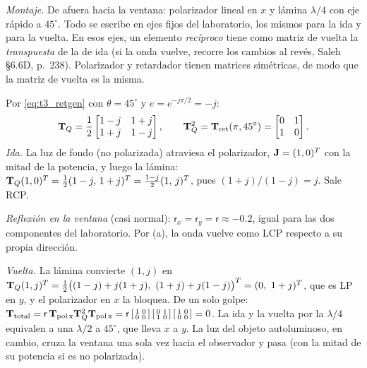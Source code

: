  \emph{Montaje.} De afuera hacia la ventana: polarizador lineal en $x$ y lámina $\lambda/4$
con eje rápido a $45^\circ$. Todo se escribe en ejes fijos del laboratorio, los mismos para la ida y
para la vuelta. En esos ejes, un elemento \emph{recíproco} tiene como matriz de vuelta la
\emph{transpuesta} de la de ida (si la onda vuelve, recorre los cambios al revés, Saleh §6.6D,
p.~238). Polarizador y retardador tienen matrices simétricas, de modo que la matriz de vuelta es la misma.

Por \eqref{eq:t3_retgen} con $\theta=45^\circ$ y $e=e^{-j\pi/2}=-j$:
\[
\mathbf T_Q=\frac12\begin{bmatrix}1-j&1+j\\1+j&1-j\end{bmatrix},\qquad
\mathbf T_Q^2=\mathbf T_{\rm ret}(\pi,45^\circ)=\begin{bmatrix}0&1\\1&0\end{bmatrix}.
\]
\emph{Ida.} La luz de fondo (no polarizada) atraviesa el polarizador, $\mathbf J=(1,0)^T$ con la mitad de la
potencia, y luego la lámina:
$\mathbf T_Q(1,0)^T=\frac12(1-j,\,1+j)^T=\frac{1-j}{2}(1,\,j)^T$, pues $(1+j)/(1-j)=j$. Sale RCP.

\emph{Reflexión en la ventana} (casi normal): $\mathsf r_x=\mathsf r_y=\mathsf r\approx-0.2$, igual para las dos
componentes del laboratorio. Por (a), la onda vuelve como LCP respecto a su propia dirección.

\emph{Vuelta.} La lámina convierte $(1,j)$ en
$\T_Q(1,j)^T=\frac12\big((1-j)+j(1+j),\ (1+j)+j(1-j)\big)^T=(0,\ 1+j)^T$, que es LP en $y$, y el polarizador en $x$ la bloquea.
De un solo golpe: $\mathbf T_{\rm total}=\mathsf r\,\mathbf T_{\rm pol\,x}\mathbf T_Q^2\mathbf T_{\rm pol\,x}
=\mathsf r\left[\begin{smallmatrix}1&0\\0&0\end{smallmatrix}\right]\left[\begin{smallmatrix}0&1\\1&0\end{smallmatrix}\right]\left[\begin{smallmatrix}1&0\\0&0\end{smallmatrix}\right]=0$.
La ida y la vuelta por la $\lambda/4$ equivalen a una $\lambda/2$ a $45^\circ$, que lleva $x$ a $y$.
La luz del objeto autoluminoso, en cambio, cruza la ventana una sola vez hacia el observador y pasa
(con la mitad de su potencia si es no polarizada).

